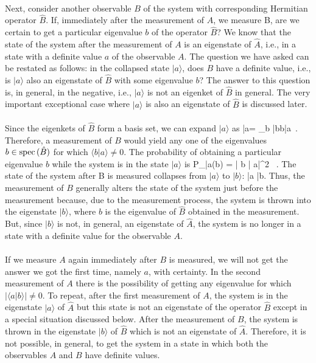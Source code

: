 \paragraph{}
Next, consider another observable $B$ of the system with corresponding Hermitian operator $\hat{B}$. If, immediately after the  measurement of $A$, we measure B, are we certain to get a particular eigenvalue $b$ of the operator $\hat{B}$?
We know that the state of the system after the measurement of $A$ is an eigenstate of $\hat{A}$, i.e., in a state with a definite value $a$ of the observable $A$. The question we have asked can be restated as follows: in the collapsed state
$|a\rangle$, does $B$ have a definite value, i.e., is $|a\rangle$ also an eigenstate of $\hat{B}$  with some eigenvalue $b$? The answer to this question is, in general, in the negative, i.e., $|a\rangle$ is not an eigenket of $\hat{B}$ in general. The very important exceptional case 
where $|a\rangle$ is also an eigenstate of $\hat{B}$ is discussed later.

\paragraph{}
Since the eigenkets of $\hat{B}$  form a basis set, we can expand $|a\rangle$ as
\be
|a\rangle = \sum_b |b\rangle \langle b|a\rangle \, .
\ee
Therefore, a measurement of $B$ would yield any one of the eigenvalues $b\in {\rm spec}\,(\hat{B})$ for which $\langle b |a\rangle \neq 0$.
The probability of obtaining a particular eigenvalue $b$ while the system is in the state $|a\rangle$ is
\be
P_{|a\rangle}(b) = \left | \langle b | a\rangle \right|^2 \, .
\ee
The state of the system after B is measured collapses from $|a\rangle$ to $|b\rangle$:
\be
|a\rangle\;\; \;\; |b\rangle.
\ee
Thus, the measurement of $B$ generally alters the state of the system just before the measurement because, due to the measurement process, the system is thrown into the eigenstate $|b\rangle$, where $b$ is the eigenvalue of  $\hat{B}$ obtained in the measurement. But, since $|b\rangle$ is not, in general, an eigenstate of $\hat{A}$, the system is no longer in a state with a definite value for the observable  $A$.

\paragraph{}
If we measure $A$ again immediately after $B$ is measured, we will not get the answer we got the first time, namely $a$, with certainty. In the second measurement of $A$ there is the possibility of getting any eigenvalue for which $\left| \langle a|b\rangle\right| \neq 0$. To repeat,  after the first measurement of $A$, the system is in the eigenstate $|a\rangle$ of
$\hat{A}$ but this state is not an eigenstate of the operator $\hat{B}$ except in a special situation discussed below. After the measurement of $B$, the system is thrown in the eigenstate $|b\rangle$ of $\hat{B}$ which is not an eigenstate of $\hat{A}$. Therefore, it is not possible, in general, to get the system in a state in which both the observables $A$ and $B$  have definite values.


